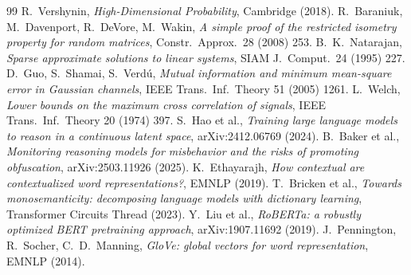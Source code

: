 \documentclass[11pt]{amsart}
\theoremstyle{plain}
\theoremstyle{definition}
\theoremstyle{remark}
\begin{document}
\begin{thebibliography}{99}
 R.~Vershynin, \emph{High-Dimensional Probability}, Cambridge (2018).
 R.~Baraniuk, M.~Davenport, R.~DeVore, M.~Wakin, \emph{A simple proof of the restricted isometry property for random matrices}, Constr.\ Approx.\ 28 (2008) 253.
 B.~K.~Natarajan, \emph{Sparse approximate solutions to linear systems}, SIAM J.\ Comput.\ 24 (1995) 227.
 D.~Guo, S.~Shamai, S.~Verd\'u, \emph{Mutual information and minimum mean-square error in Gaussian channels}, IEEE Trans.\ Inf.\ Theory 51 (2005) 1261.
 L.~Welch, \emph{Lower bounds on the maximum cross correlation of signals}, IEEE Trans.\ Inf.\ Theory 20 (1974) 397.
 S.~Hao et al., \emph{Training large language models to reason in a continuous latent space}, arXiv:2412.06769 (2024).
 B.~Baker et al., \emph{Monitoring reasoning models for misbehavior and the risks of promoting obfuscation}, arXiv:2503.11926 (2025).
 K.~Ethayarajh, \emph{How contextual are contextualized word representations?}, EMNLP (2019).
 T.~Bricken et al., \emph{Towards monosemanticity: decomposing language models with dictionary learning}, Transformer Circuits Thread (2023).
 Y.~Liu et al., \emph{RoBERTa: a robustly optimized BERT pretraining approach}, arXiv:1907.11692 (2019).
 J.~Pennington, R.~Socher, C.~D.~Manning, \emph{GloVe: global vectors for word representation}, EMNLP (2014).
\end{thebibliography}
\end{document}
